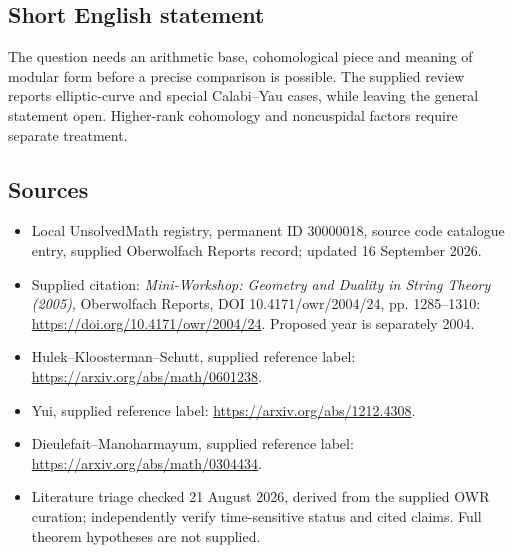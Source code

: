 \documentclass[11pt]{article}
\begin{document}
\subsection{Short English statement}
The question needs an arithmetic base, cohomological piece and meaning of modular form before a precise comparison is possible. The supplied review reports elliptic-curve and special Calabi–Yau cases, while leaving the general statement open. Higher-rank cohomology and noncuspidal factors require separate treatment.
\subsection{Sources}
\begin{itemize}
\item Local UnsolvedMath registry, permanent ID 30000018, source code catalogue entry, supplied Oberwolfach Reports record; updated 16 September 2026.
\item Supplied citation: \emph{Mini-Workshop: Geometry and Duality in String Theory (2005)}, Oberwolfach Reports, DOI 10.4171/owr/2004/24, pp. 1285--1310: \url{https://doi.org/10.4171/owr/2004/24}. Proposed year is separately 2004.
\item Hulek--Kloosterman--Schutt, supplied reference label: \url{https://arxiv.org/abs/math/0601238}.
\item Yui, supplied reference label: \url{https://arxiv.org/abs/1212.4308}.
\item Dieulefait--Manoharmayum, supplied reference label: \url{https://arxiv.org/abs/math/0304434}.
\item Literature triage checked 21 August 2026, derived from the supplied OWR curation; independently verify time-sensitive status and cited claims. Full theorem hypotheses are not supplied.
\end{itemize}
\end{document}
